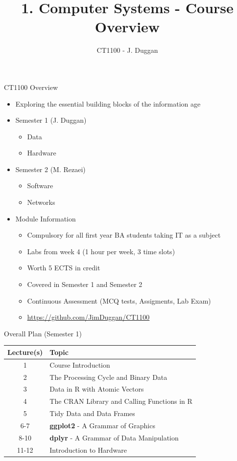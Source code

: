 \documentclass[ignorenonframetext,]{beamer}
\title{1. Computer Systems - Course Overview}
\author{CT1100 - J. Duggan}
\date{}
\providecommand{\tightlist}{%
  \setlength{\itemsep}{0pt}\setlength{\parskip}{0pt}}
\begin{document}
\frame{\titlepage}

\begin{frame}{CT1100 Overview}
\protect\hypertarget{ct1100-overview}{}

\begin{itemize}
\tightlist
\item
  Exploring the essential building blocks of the information age
\item
  Semester 1 (J. Duggan)

  \begin{itemize}
  \tightlist
  \item
    Data
  \item
    Hardware
  \end{itemize}
\item
  Semester 2 (M. Rezaei)

  \begin{itemize}
  \tightlist
  \item
    Software
  \item
    Networks
  \end{itemize}
\item
  Module Information

  \begin{itemize}
  \tightlist
  \item
    Compulsory for all first year BA students taking IT as a subject
  \item
    Labs from week 4 (1 hour per week, 3 time slots)
  \item
    Worth 5 ECTS in credit
  \item
    Covered in Semester 1 and Semester 2
  \item
    Continuous Assessment (MCQ tests, Assigments, Lab Exam)
  \item
    \url{https://github.com/JimDuggan/CT1100}
  \end{itemize}
\end{itemize}

\end{frame}

\begin{frame}{Overall Plan (Semester 1)}
\protect\hypertarget{overall-plan-semester-1}{}

\begin{longtable}[]{@{}cl@{}}
\toprule
Lecture(s) & Topic\tabularnewline
\midrule
\endhead
1 & Course Introduction\tabularnewline
2 & The Processing Cycle and Binary Data\tabularnewline
3 & Data in R with Atomic Vectors\tabularnewline
4 & The CRAN Library and Calling Functions in R\tabularnewline
5 & Tidy Data and Data Frames\tabularnewline
6-7 & \textbf{ggplot2} - A Grammar of Graphics\tabularnewline
8-10 & \textbf{dplyr} - A Grammar of Data Manipulation\tabularnewline
11-12 & Introduction to Hardware\tabularnewline
\bottomrule
\end{longtable}

\end{frame}
\end{document}

